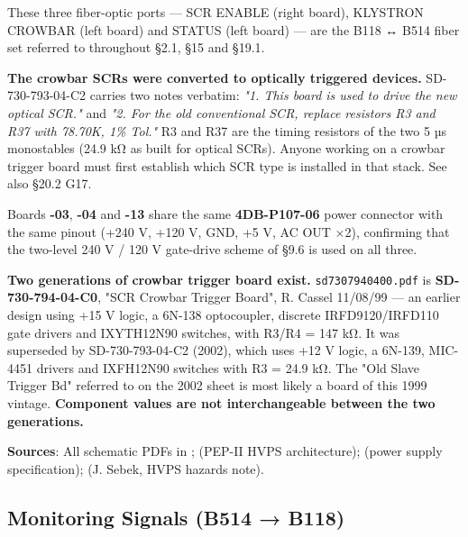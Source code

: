 These three fiber-optic ports --- SCR ENABLE (right board), KLYSTRON CROWBAR (left board) and STATUS (left board) --- are the B118 ↔ B514 fiber set referred to throughout §2.1, §15 and §19.1.

\begin{keynote}
\textbf{The crowbar SCRs were converted to optically triggered devices.} SD-730-793-04-C2 carries two notes verbatim: \emph{"1. This board is used to drive the new optical SCR."} and \emph{"2. For the old conventional SCR, replace resistors R3 and R37 with 78.70K, 1\% Tol."} R3 and R37 are the timing resistors of the two 5 µs monostables (24.9 kΩ as built for optical SCRs). Anyone working on a crowbar trigger board must first establish which SCR type is installed in that stack. See also §20.2 G17.
\end{keynote}

\begin{keynote}
Boards \textbf{-03}, \textbf{-04} and \textbf{-13} share the same \textbf{4DB-P107-06} power connector with the same pinout (+240 V, +120 V, GND, +5 V, AC OUT ×2), confirming that the two-level 240 V / 120 V gate-drive scheme of §9.6 is used on all three.
\end{keynote}

\begin{keynote}
\textbf{Two generations of crowbar trigger board exist.} \texttt{sd7307940400.pdf} is \textbf{SD-730-794-04-C0}, "SCR Crowbar Trigger Board", R. Cassel 11/08/99 --- an earlier design using +15 V logic, a 6N-138 optocoupler, discrete IRFD9120/IRFD110 gate drivers and IXYTH12N90 switches, with R3/R4 = 147 kΩ. It was superseded by SD-730-793-04-C2 (2002), which uses +12 V logic, a 6N-139, MIC-4451 drivers and IXFH12N90 switches with R3 = 24.9 kΩ. The "Old Slave Trigger Bd" referred to on the 2002 sheet is most likely a board of this 1999 vintage. \textbf{Component values are not interchangeable between the two generations.}
\end{keynote}

\begin{keynote}
\textbf{Sources}: All schematic PDFs in  ;  (PEP-II HVPS architecture);  (power supply specification);  (J. Sebek, HVPS hazards note).
\end{keynote}

\subsection{Monitoring Signals (B514 → B118)}

